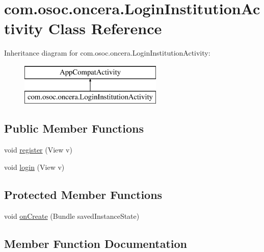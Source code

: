 \hypertarget{classcom_1_1osoc_1_1oncera_1_1_login_institution_activity}{}\section{com.\+osoc.\+oncera.\+Login\+Institution\+Activity Class Reference}
\label{classcom_1_1osoc_1_1oncera_1_1_login_institution_activity}
Inheritance diagram for com.\+osoc.\+oncera.\+Login\+Institution\+Activity\+:\begin{figure}[H]
\begin{center}
\leavevmode
\includegraphics[height=2.000000cm]{classcom_1_1osoc_1_1oncera_1_1_login_institution_activity}
\end{center}
\end{figure}
\subsection*{Public Member Functions}
\begin{DoxyCompactItemize}
\item 
void \mbox{\hyperlink{classcom_1_1osoc_1_1oncera_1_1_login_institution_activity_a5ace1b5572af28cd76e4b094a240f7be}{register}} (View v)
\item 
void \mbox{\hyperlink{classcom_1_1osoc_1_1oncera_1_1_login_institution_activity_a749392730f65ff16adb010f0ae0b9c83}{login}} (View v)
\end{DoxyCompactItemize}
\subsection*{Protected Member Functions}
\begin{DoxyCompactItemize}
\item 
void \mbox{\hyperlink{classcom_1_1osoc_1_1oncera_1_1_login_institution_activity_a66a57b5da46c93ec42702ba2f2e4b2b1}{on\+Create}} (Bundle saved\+Instance\+State)
\end{DoxyCompactItemize}


\subsection{Member Function Documentation}
\mbox{\label{classcom_1_1osoc_1_1oncera_1_1_login_institution_activity_a749392730f65ff16adb010f0ae0b9c83}} 
